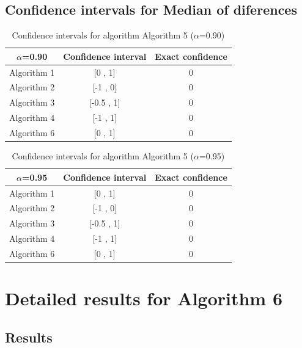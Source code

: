 \documentclass[a4paper,10pt]{article}
\begin{document}
\subsection{Confidence intervals for Median of diferences}

\begin{table}[!htp]
\centering\small
\begin{tabular}{
|c|c|c|}
\hline
 $\alpha$=0.90 & Confidence interval & Exact confidence \\ \hline 
Algorithm 1 & [0 , 1] & 0\\ \hline 
Algorithm 2 & [-1 , 0] & 0\\ \hline 
Algorithm 3 & [-0.5 , 1] & 0\\ \hline 
Algorithm 4 & [-1 , 1] & 0\\ \hline 
Algorithm 6 & [0 , 1] & 0\\ \hline 

\end{tabular}
\caption{Confidence intervals for algorithm Algorithm 5 ($\alpha$=0.90)}
\end{table}
\begin{table}[!htp]
\centering\small
\begin{tabular}{
|c|c|c|}
\hline
 $\alpha$=0.95 & Confidence interval & Exact confidence \\ \hline 
Algorithm 1 & [0 , 1] & 0\\ \hline 
Algorithm 2 & [-1 , 0] & 0\\ \hline 
Algorithm 3 & [-0.5 , 1] & 0\\ \hline 
Algorithm 4 & [-1 , 1] & 0\\ \hline 
Algorithm 6 & [0 , 1] & 0\\ \hline 

\end{tabular}
\caption{Confidence intervals for algorithm Algorithm 5 ($\alpha$=0.95)}
\end{table}

 \clearpage 


\section{Detailed results for Algorithm 6}


\subsection{Results}
\end{document}
